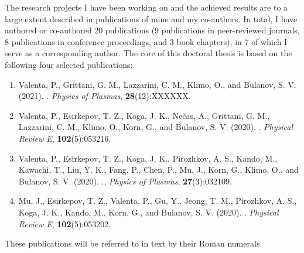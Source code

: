 \documentclass[10pt, a4paper, twoside, openright]{report}
\newcommand{\link}[3][blue]{\href{#2}{\color{#1}{#3}}}%
\begin{document}

The research projects I have been working on and the achieved results are to a large extent described in publications of mine and my co-authors. In total, I have authored or co-authored 20 publications (9 publications in peer-reviewed journals, 8 publications in conference proceedings, and 3 book chapters), in 7 of which I serve as a corresponding author. The core of this doctoral thesis is based on the following four selected publications:
\begin{enumerate}[label=\Roman*.]
	\item \label{paper_1} Valenta, P., Grittani, G. M., Lazzarini, C. M., Klimo, O., and Bulanov, S. V. (2021). \link{http://dx.doi.org/}{On the electromagnetic-electron rings originating from the interaction of high-power short-pulse laser and underdense plasma}. \textit{Physics of Plasmas}, \textbf{28}(12):XXXXXX.
	
	\item \label{paper_2} Valenta, P., Esirkepov, T. Z., Koga, J. K., Nečas, A., Grittani, G. M., Lazzarini, C. M., Klimo, O., Korn, G., and Bulanov, S. V. (2020). \link{http://dx.doi.org/10.1103/PhysRevE.102.053216}{Polarity reversal of wakefields driven by ultrashort pulse laser}. \textit{Physical Review E}, \textbf{102}(5):053216.
	
	\item \label{paper_3} Valenta, P., Esirkepov, T. Z., Koga, J. K., Pirozhkov, A. S., Kando, M., Kawachi, T., Liu, Y. K., Fang, P., Chen, P., Mu, J., Korn, G., Klimo, O., and Bulanov, S. V. (2020). \link{http://dx.doi.org/10.1063/1.5142084}{Recoil effects on reflection from relativistic mirrors in laser plasmas}., \textit{Physics of Plasmas}, \textbf{27}(3):032109.
	
	\item \label{paper_4} Mu, J., Esirkepov, T. Z., Valenta, P., Gu, Y., Jeong, T. M., Pirozhkov, A. S., Koga, J. K., Kando, M., Korn, G., and Bulanov, S. V. (2020). \link{http://dx.doi.org/10.1103/PhysRevE.102.053202}{Relativistic flying forcibly oscillating reflective diffraction grating}. \textit{Physical Review E}, \textbf{102}(5):053202.
	
\end{enumerate}
These publications will be referred to in text by their Roman numerals.

\end{document}

